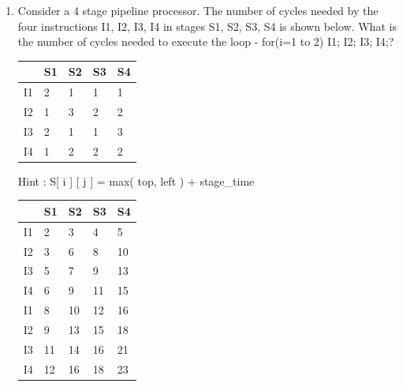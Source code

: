 \begin{enumerate}
    \newpage

    \item Consider a 4 stage pipeline processor.   The number of cycles needed by the four
             instructions I1, I2, I3, I4 in stages S1, S2, S3, S4 is shown below. What is the number of cycles needed to execute the loop - for(i=1 to 2) {I1; I2; I3; I4;}?

             \begin{myTableStyle} \begin{tabular}{ |m{1cm}|m{1cm}|m{1cm}|m{1cm}|m{1cm}| } \hline
                   & S1 & S2 & S3 & S4 \\ \hline
                I1 & 2  & 1  & 1  & 1  \\ \hline
                I2 & 1  & 3  & 2  & 2  \\ \hline
                I3 & 2  & 1  & 1  & 3  \\ \hline
                I4 & 1  & 2  & 2  & 2  \\ \hline
              \end{tabular} \end{myTableStyle} \vspace{0.08in}

    Hint : \quad S[ i ] [ j ] = max( top, left ) + stage\_time \\

   \begin{myTableStyle} \begin{tabular}{ |m{1cm}|m{1cm}|m{1cm}|m{1cm}|m{1cm}| } \hline
                   & S1 & S2 & S3  & S4 \\ \hline
                I1 & 2  & 3  & 4   & 5  \\ \hline
                I2 & 3  & 6  & 8   & 10  \\ \hline
                I3 & 5  & 7  & 9   & 13  \\ \hline
                I4 & 6  & 9  & 11  & 15  \\ \hline
                I1 & 8  & 10 & 12  & 16  \\ \hline
                I2 & 9  & 13 & 15  & 18  \\ \hline
                I3 & 11 & 14 & 16  & 21  \\ \hline
                I4 & 12 & 16 & 18  & 23  \\ \hline
              \end{tabular} \end{myTableStyle} \vspace{0.08in}


\end{enumerate}
